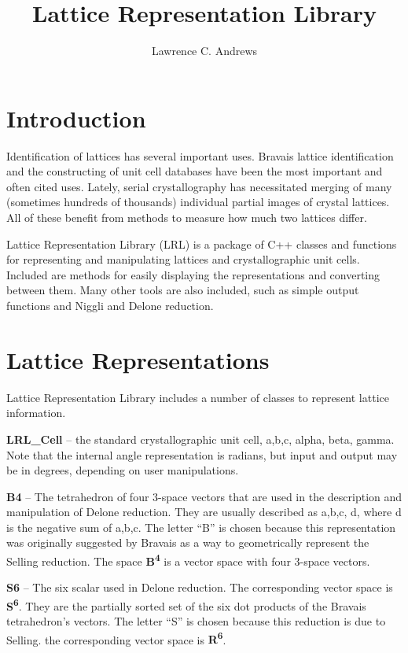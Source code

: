 \documentclass[11pt]{article} %
\title{Lattice Representation Library}
\author{Lawrence C. Andrews}
\begin{document}
\maketitle
\tableofcontents

\section{Introduction}

Identification of lattices has several important uses. Bravais lattice identification and the constructing of unit cell databases have been the most important and often cited uses. Lately, serial crystallography has necessitated merging of many (sometimes hundreds of thousands) individual partial images of crystal lattices. All of these benefit from methods to measure how much two lattices differ.

Lattice Representation Library (LRL) is a package of C++ classes and functions for representing and manipulating lattices and crystallographic unit cells. Included are methods for easily displaying the representations and converting between them. Many other tools are also included, such as simple output functions and Niggli and Delone reduction.

\section{Lattice Representations}

Lattice Representation Library includes a number of classes to represent lattice information.

\textbf{LRL\_Cell} – the standard crystallographic unit cell, a,b,c, alpha, beta, gamma. Note that the internal angle representation is radians, but input and output may be in degrees, depending on user manipulations.

\textbf{B4} – The tetrahedron of four 3-space vectors that are used in the description and manipulation of Delone reduction. They are usually described as a,b,c, d, where d is the negative sum of a,b,c. The letter “B” is chosen because this representation was originally suggested by Bravais as a way to geometrically represent the Selling reduction. The space \textbf{B\textsuperscript{4}} is a vector space with four 3-space vectors.

\textbf{S6} – The six scalar used in Delone reduction. The corresponding vector space is \textbf{S\textsuperscript{6}}. They are the partially sorted set of the six dot products of the Bravais tetrahedron’s vectors. The letter “S” is chosen because this reduction is due to Selling. the corresponding vector space is \textbf{R\textsuperscript{6}}.
\end{document}
